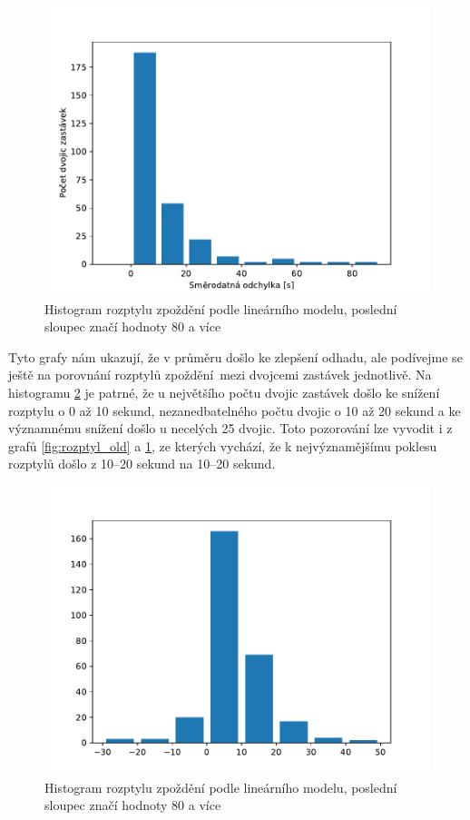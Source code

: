 \begin{figure}
	\centering
  \includegraphics[width=1\linewidth]{../img/rozptyl_new}
  \caption{Histogram rozptylu zpoždění podle lineárního modelu, poslední sloupec značí hodnoty 80 a více}
  \label{fig:rozptyl_new}
\end{figure}

\bigbreak

Tyto grafy nám ukazují, že v průměru došlo ke zlepšení odhadu, ale podívejme se ještě na porovnání rozptylů zpoždění mezi dvojcemi zastávek jednotlivě. Na histogramu \ref{fig:rozptyl_diff} je patrné, že u největšího počtu dvojic zastávek došlo ke snížení rozptylu o 0 až 10 sekund, nezanedbatelného počtu dvojic o 10 až 20 sekund a ke významnému snížení došlo u necelých 25 dvojic. Toto pozorování lze vyvodit i z grafů \ref{fig:rozptyl_old} a \ref{fig:rozptyl_new}, ze kterých vychází, že k nejvýznamějšímu poklesu rozptylů došlo z 10--20 sekund na 10--20 sekund.

\begin{figure}
	\centering
  \includegraphics[width=1\linewidth]{../img/rozptyl_diff}
  \caption{Histogram rozptylu zpoždění podle lineárního modelu, poslední sloupec značí hodnoty 80 a více}
  \label{fig:rozptyl_diff}
\end{figure}

